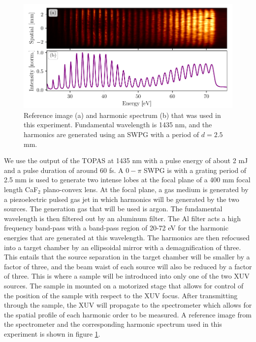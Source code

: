 \begin{figure}
	\centering
	\includegraphics[width=1.0\textwidth]{figures/refractive_index/reference_img_spectrum.pdf}
	\caption[Reference image and spectrum of harmonics used to measure refractive index using SWPG]{Reference image (a) and harmonic spectrum (b) that was used in this experiment.  Fundamental wavelength is 1435 nm, and the harmonics are generated using an SWPG with a period of $d=2.5$ mm.}
	\label{fig:ref_img_spec}
\end{figure}
We use the output of the TOPAS at 1435 nm with a pulse energy of about 2 mJ and a pulse duration of around 60 fs. A $0-\pi$ SWPG is with a grating period of 2.5 mm is used to generate two intense lobes at the focal plane of a 400 mm focal length CaF$_2$ plano-convex lens. At the focal plane, a gas medium is generated by a piezoelectric pulsed gas jet in which harmonics will be generated by the two sources.  The generation gas that will be used is argon. The fundamental wavelength is then filtered out by an aluminum filter.  The Al filter acts a high frequency band-pass with a band-pass region of 20-72 eV for the harmonic energies that are generated at this wavelength. The harmonics are then refocused into a target chamber by an ellipsoidal mirror with a demagnification of three.  This entails that the source separation in the target chamber will be smaller by a factor of three, and the beam waist of each source will also be reduced by a factor of three.  This is where a sample will be introduced into only one of the two XUV sources. The sample in mounted on a motorized stage that allows for control of the position of the sample with respect to the XUV focus. After transmitting through the sample, the XUV will propagate to the spectrometer which allows for the spatial profile of each harmonic order to be measured.  A reference image from the spectrometer and the corresponding harmonic spectrum used in this experiment is shown in figure \ref{fig:ref_img_spec}.

